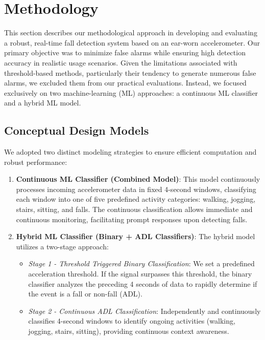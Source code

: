 \documentclass[conference]{IEEEtran}
\begin{document}
\section{Methodology}

This section describes our methodological approach in developing and evaluating a robust, real-time fall detection system based on an ear-worn accelerometer. Our primary objective was to minimize false alarms while ensuring high detection accuracy in realistic usage scenarios. Given the limitations associated with threshold-based methods, particularly their tendency to generate numerous false alarms, we excluded them from our practical evaluations. Instead, we focused exclusively on two machine-learning (ML) approaches: a continuous ML classifier and a hybrid ML model.

\subsection{Conceptual Design Models}

We adopted two distinct modeling strategies to ensure efficient computation and robust performance:
\vspace{1em}

\begin{enumerate}
\item \textbf{Continuous ML Classifier (Combined Model)}: This model continuously processes incoming accelerometer data in fixed 4-second windows, classifying each window into one of five predefined activity categories: walking, jogging, stairs, sitting, and falls. The continuous classification allows immediate and continuous monitoring, facilitating prompt responses upon detecting falls.

\vspace{1em}
\item \textbf{Hybrid ML Classifier (Binary + ADL Classifiers)}: The hybrid model utilizes a two-stage approach:
\begin{itemize}
    \item \textit{Stage 1 - Threshold Triggered Binary Classification}: We set a predefined acceleration threshold. If the signal surpasses this threshold, the binary classifier analyzes the preceding 4 seconds of data to rapidly determine if the event is a fall or non-fall (ADL).
    \item \textit{Stage 2 - Continuous ADL Classification}: Independently and continuously classifies 4-second windows to identify ongoing activities (walking, jogging, stairs, sitting), providing continuous context awareness.
\end{itemize}
\end{enumerate}
\end{document}
